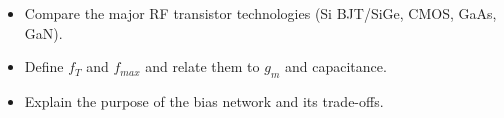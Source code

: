 \begin{objectives}
\begin{itemize}[leftmargin=1.4em,itemsep=2pt]
\item Compare the major RF transistor technologies (Si BJT/SiGe, CMOS, GaAs, GaN).
\item Define $f_T$ and $f_{max}$ and relate them to $g_m$ and capacitance.
\item Explain the purpose of the bias network and its trade-offs.
\end{itemize}
\end{objectives}
